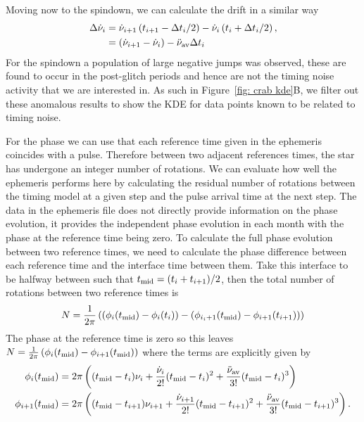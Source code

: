 \documentclass[../full_thesis/full_thesis.tex]{subfiles}
\begin{document}
\begin{subappendices}
Moving now to the spindown, we can calculate the drift in a similar way
\begin{align}
\Delta\dot{\nu}_{i} & = \dot{\nu}_{i+1}\left(t_{i+1}-\Delta t_{i}/2\right) -  \dot{\nu}_{i}\left(t_{i}+\Delta t_{i}/2\right), \\
& = \left(\dot{\nu}_{i+1}-\dot{\nu}_{i}\right) -  \ddot{\nu}_{\textrm{av}} \Delta t_{i}
\label{eqn: crab spindown residuals}
\end{align}
For the spindown a population of large negative jumps was observed, these are
found to occur in the post-glitch periods and hence are not the timing noise
activity that we are interested in. As such in Figure~\ref{fig: crab kde}B, we
filter out these anomalous results to show the KDE for data points known to be
related to timing noise.

For the phase we can use that each reference time given in the ephemeris
coincides with a pulse. Therefore between two adjacent references times, the
star has undergone an integer number of rotations. We can evaluate how well the
ephemeris performs here by calculating the residual number of rotations between
the timing model at a given step and the pulse arrival time at the next step.
The data in the ephemeris file does not directly provide information on the
phase evolution, it provides the independent phase evolution in each month with
the phase at the reference time being zero. To calculate the full phase
evolution between two reference times, we need to calculate the phase
difference between each reference time and the interface time between them.
Take this interface to be halfway between such that $t_{\textrm{mid}}=(t_{i} +
t_{i+1})/2$, then the total number of rotations between two reference times is
\begin{equation}
    N = \frac{1}{2\pi}\left(\left(\phi_{i}(t_{\textrm{mid}}) - \phi_{i}(t_{i})\right) -
    \left(\phi_{i_i+1}(t_{\textrm{mid}}) - \phi_{i+1}(t_{i+1})\right)\right)
\end{equation}
The phase at the reference time is zero so this leaves $N =
\frac{1}{2\pi}\left(\phi_{i}(t_{\textrm{mid}}) - \phi_{i+1}(t_{\textrm{mid}})\right)$ where the terms
are explicitly given by
\begin{align}
\phi_{i}(t_{\textrm{mid}}) & = 2\pi\left((t_{\textrm{mid}} - t_{i})\nu_{i} +  \frac{\dot{\nu}_{i}}{2!}(t_{\textrm{mid}} - t_{i})^{2}+\frac{\ddot{\nu}_{\textrm{av}}}{3!}(t_{\textrm{mid}} - t_{i})^{3}\right) \\
\phi_{i+1}(t_{\textrm{mid}}) & = 2\pi\left((t_{\textrm{mid}} - t_{i+1})\nu_{i+1} +  \frac{\dot{\nu}_{i+1}}{2!}(t_{\textrm{mid}} - t_{i+1})^{2}+\frac{\ddot{\nu}_{\textrm{av}}}{3!}(t_{\textrm{mid}} - t_{i+1})^{3}\right) .
\end{align}


\end{subappendices}
\end{document}
